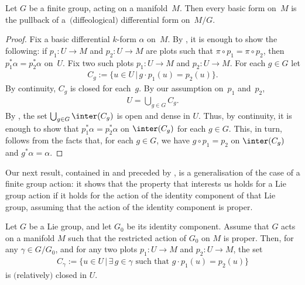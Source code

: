 \begin{Proposition} \label{p:finite}
Let $G$ be a finite group, acting on a manifold~$M$.
Then every basic form on~$M$ is the pullback of a~$($diffeological$)$ differential form on~$M/G$.
\end{Proposition}

\begin{proof}
Fix a basic dif\/ferential $k$-form $\alpha$ on~$M$.
By ,
it is enough to show the following:
if $p_1 \colon U \to M$ and $p_2 \colon U \to M$ are plots
such that $\pi \circ p_1 = \pi \circ p_2$,
then $p_1^* \alpha = p_2^*\alpha$ on~$U$.
Fix two such plots $p_1 \colon U \to M$ and $p_2 \colon U \to M$.
For each $g \in G$ let
\begin{gather*} C_g := \{ u \in U\,|\, g \cdot p_1(u) = p_2(u) \}.\end{gather*}
By continuity, $C_g$ is closed for each~$g$.
By our assumption on~$p_1$ and~$p_2$,
\begin{gather*} U = \bigcup_{g\in G} C_g. \end{gather*}
By ,
the set $\bigcup_{g \in G} \inter(C_g)$
is open and dense in $U$. Thus, by continuity, it is enough to show
that $p_1^* \alpha = p_2^*\alpha$ on $\inter(C_g)$ for each $g \in G$. This, in turn, follows from the facts that, for each $g\in G$, we have $g\circ p_1=p_2$ on $\inter(C_g)$ and $g^*\alpha=\alpha$.
\end{proof}

Our next result, contained in 
and preceded by ,
is a generalisation of the case of a f\/inite group action:
it shows that the property that interests us
holds for a Lie group action
if it holds for the action of the identity component of that
Lie group, assuming that the action of the identity component is proper.


\begin{Lemma}\label{l:C closed}
Let $G$ be a Lie group, and let $G_0$ be its identity component.
Assume that $G$ acts on a manifold $M$ such that the restricted action
of $G_0$ on $M$ is proper. Then, for any $\gamma\in G/G_0$,
and for any two plots $p_1 \colon U \to M$ and $p_2 \colon U \to M$, the set
\begin{gather*} C_\gamma := \{ u \in U\,|\, \exists\, g \in\gamma\text{ such that }
 g\cdot p_1(u)=p_2(u)\}\end{gather*}
is $($relatively$)$ closed in $U$.
\end{Lemma}

